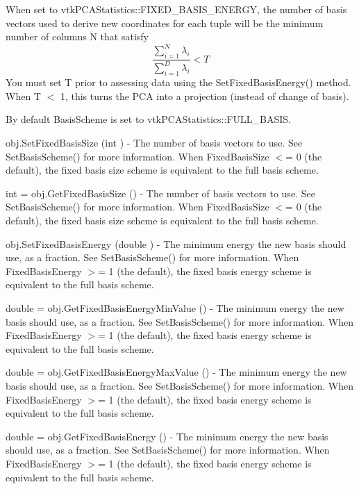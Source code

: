 \begin{DoxyItemize}
When set to vtk\-P\-C\-A\-Statistics\-::\-F\-I\-X\-E\-D\-\_\-\-B\-A\-S\-I\-S\-\_\-\-E\-N\-E\-R\-G\-Y, the number of basis vectors used to derive new coordinates for each tuple will be the minimum number of columns N that satisfy \[ \frac{\sum_{i=1}^{N} \lambda_i}{\sum_{i=1}^{D} \lambda_i} < T \] You must set T prior to assessing data using the Set\-Fixed\-Basis\-Energy() method. When T $<$ 1, this turns the P\-C\-A into a projection (instead of change of basis).

By default Basis\-Scheme is set to vtk\-P\-C\-A\-Statistics\-::\-F\-U\-L\-L\-\_\-\-B\-A\-S\-I\-S.  
\item {\ttfamily obj.\-Set\-Fixed\-Basis\-Size (int )} -\/ The number of basis vectors to use. See Set\-Basis\-Scheme() for more information. When Fixed\-Basis\-Size $<$= 0 (the default), the fixed basis size scheme is equivalent to the full basis scheme.  
\item {\ttfamily int = obj.\-Get\-Fixed\-Basis\-Size ()} -\/ The number of basis vectors to use. See Set\-Basis\-Scheme() for more information. When Fixed\-Basis\-Size $<$= 0 (the default), the fixed basis size scheme is equivalent to the full basis scheme.  
\item {\ttfamily obj.\-Set\-Fixed\-Basis\-Energy (double )} -\/ The minimum energy the new basis should use, as a fraction. See Set\-Basis\-Scheme() for more information. When Fixed\-Basis\-Energy $>$= 1 (the default), the fixed basis energy scheme is equivalent to the full basis scheme.  
\item {\ttfamily double = obj.\-Get\-Fixed\-Basis\-Energy\-Min\-Value ()} -\/ The minimum energy the new basis should use, as a fraction. See Set\-Basis\-Scheme() for more information. When Fixed\-Basis\-Energy $>$= 1 (the default), the fixed basis energy scheme is equivalent to the full basis scheme.  
\item {\ttfamily double = obj.\-Get\-Fixed\-Basis\-Energy\-Max\-Value ()} -\/ The minimum energy the new basis should use, as a fraction. See Set\-Basis\-Scheme() for more information. When Fixed\-Basis\-Energy $>$= 1 (the default), the fixed basis energy scheme is equivalent to the full basis scheme.  
\item {\ttfamily double = obj.\-Get\-Fixed\-Basis\-Energy ()} -\/ The minimum energy the new basis should use, as a fraction. See Set\-Basis\-Scheme() for more information. When Fixed\-Basis\-Energy $>$= 1 (the default), the fixed basis energy scheme is equivalent to the full basis scheme.  
\end{DoxyItemize}\hypertarget{vtkinfovis_vtkpcomputehistogram2doutliers}{}\section{vtk\-P\-Compute\-Histogram2\-D\-Outliers}\label{vtkinfovis_vtkpcomputehistogram2doutliers}
